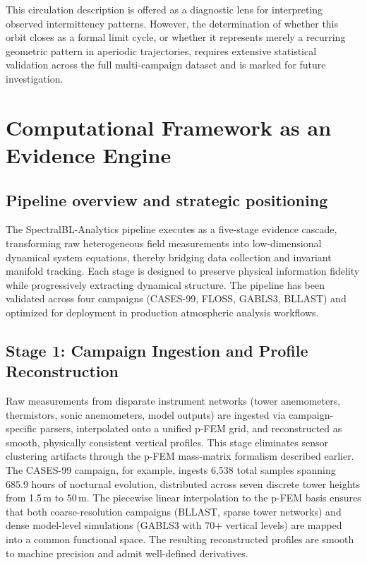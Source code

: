 \documentclass[12pt,a4paper]{article}
\begin{document}
This circulation description is offered as a diagnostic lens for interpreting observed intermittency patterns. However, the determination of whether this orbit closes as a formal limit cycle, or whether it represents merely a recurring geometric pattern in aperiodic trajectories, requires extensive statistical validation across the full multi-campaign dataset and is marked for future investigation.

\section{Computational Framework as an Evidence Engine}

\subsection{Pipeline overview and strategic positioning}

The SpectralBL-Analytics pipeline executes as a five-stage evidence cascade, transforming raw heterogeneous field measurements into low-dimensional dynamical system equations, thereby bridging data collection and invariant manifold tracking. Each stage is designed to preserve physical information fidelity while progressively extracting dynamical structure. The pipeline has been validated across four campaigns (CASES-99, FLOSS, GABLS3, BLLAST) and optimized for deployment in production atmospheric analysis workflows.

\subsection{Stage 1: Campaign Ingestion and Profile Reconstruction}

Raw measurements from disparate instrument networks (tower anemometers, thermistors, sonic anemometers, model outputs) are ingested via campaign-specific parsers, interpolated onto a unified p-FEM grid, and reconstructed as smooth, physically consistent vertical profiles. This stage eliminates sensor clustering artifacts through the p-FEM mass-matrix formalism described earlier. The CASES-99 campaign, for example, ingests 6,538 total samples spanning 685.9 hours of nocturnal evolution, distributed across seven discrete tower heights from 1.5\,m to 50\,m. The piecewise linear interpolation to the p-FEM basis ensures that both coarse-resolution campaigns (BLLAST, sparse tower networks) and dense model-level simulations (GABLS3 with 70+ vertical levels) are mapped into a common functional space. The resulting reconstructed profiles are smooth to machine precision and admit well-defined derivatives.
\end{document}

